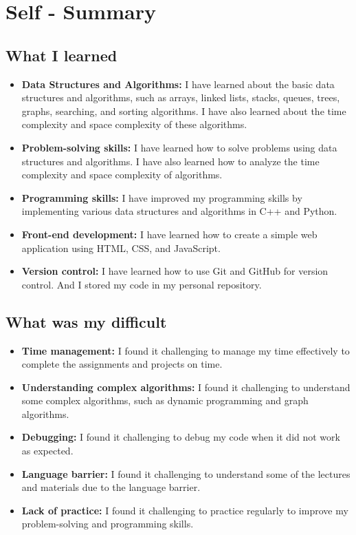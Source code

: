 \section{Self - Summary}

\subsection{What I learned}
\begin{itemize}
	\item \textbf{Data Structures and Algorithms:} I have learned about the basic data structures and algorithms, such as arrays, linked lists, stacks, queues, trees, graphs, searching, and sorting algorithms. I have also learned about the time complexity and space complexity of these algorithms.
	\item \textbf{Problem-solving skills:} I have learned how to solve problems using data structures and algorithms. I have also learned how to analyze the time complexity and space complexity of algorithms.
	\item \textbf{Programming skills:} I have improved my programming skills by implementing various data structures and algorithms in C++ and Python.
	\item \textbf{Front-end development:} I have learned how to create a simple web application using HTML, CSS, and JavaScript.
	\item \textbf{Version control:} I have learned how to use Git and GitHub for version control. And I stored my code in my personal repository.
\end{itemize}

\subsection{What was my difficult}
\begin{itemize}
	\item \textbf{Time management:} I found it challenging to manage my time effectively to complete the assignments and projects on time.
	\item \textbf{Understanding complex algorithms:} I found it challenging to understand some complex algorithms, such as dynamic programming and graph algorithms.
	\item \textbf{Debugging:} I found it challenging to debug my code when it did not work as expected.
	\item \textbf{Language barrier:} I found it challenging to understand some of the lectures and materials due to the language barrier.
	\item \textbf{Lack of practice:} I found it challenging to practice regularly to improve my problem-solving and programming skills.
\end{itemize}
